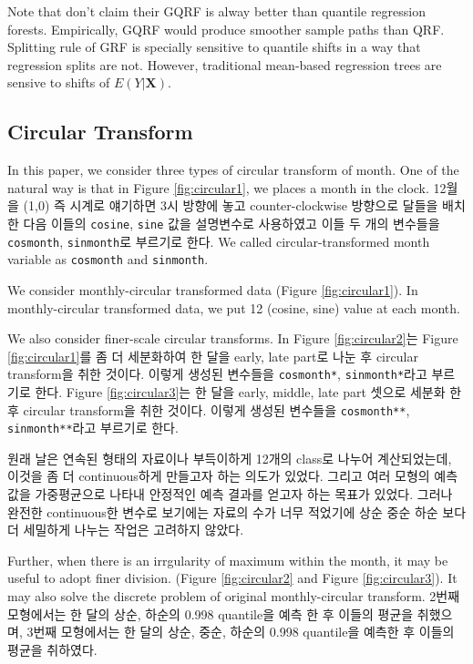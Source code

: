 \documentclass[11pt,titlepage]{article}
\begin{document}
	Note that \citep{Athey2016} don't claim their GQRF is alway better than quantile regression forests. Empirically, GQRF would produce smoother sample paths than QRF. Splitting rule of GRF is specially sensitive to quantile shifts in a way that regression splits are not. However, traditional mean-based regression trees are sensive to shifts of $E(Y|\mathbf{X})$.
	
	\subsection{Circular Transform}
	
	In this paper, we consider three types of circular transform of month. One of the natural way is that in Figure \ref{fig:circular1}, we places a month in the clock. 12월을 (1,0) 즉 시계로 얘기하면 3시 방향에 놓고 counter-clockwise 방향으로 달들을 배치한 다음 이들의 \texttt{cosine}, \texttt{sine} 값을 설명변수로 사용하였고 이들 두 개의 변수들을 \texttt{cosmonth}, \texttt{sinmonth}로 부르기로 한다. We called circular-transformed month variable as \texttt{cosmonth} and \texttt{sinmonth}.
	
	We consider monthly-circular transformed data (Figure \ref{fig:circular1}). In monthly-circular transformed data, we put 12 (cosine, sine) value at each month.
	
	We also consider finer-scale circular transforms. In Figure \ref{fig:circular2}는 Figure \ref{fig:circular1}를 좀 더 세분화하여 한 달을 early, late part로 나눈 후 circular transform을 취한 것이다. 이렇게 생성된 변수들을 \texttt{cosmonth*}, \texttt{sinmonth*}라고 부르기로 한다. Figure \ref{fig:circular3}는 한 달을 early, middle, late part 셋으로 세분화 한 후 circular transform을 취한 것이다. 이렇게 생성된 변수들을 \texttt{cosmonth**}, \texttt{sinmonth**}라고 부르기로 한다.
	
	원래 날은 연속된 형태의 자료이나 부득이하게 12개의 class로 나누어 계산되었는데, 이것을 좀 더 continuous하게 만들고자 하는 의도가 있었다. 그리고 여러 모형의 예측값을 가중평균으로 나타내 안정적인 예측 결과를 얻고자 하는 목표가 있었다. 그러나 완전한 continuous한 변수로 보기에는 자료의 수가 너무 적었기에 상순 중순 하순 보다 더 세밀하게 나누는 작업은 고려하지 않았다.
	
	
	Further, when there is an irrgularity of maximum within the month, it may be useful to adopt finer division. (Figure \ref{fig:circular2} and Figure \ref{fig:circular3}). It may also solve the discrete problem of original monthly-circular transform. 2번째 모형에서는 한 달의 상순, 하순의 0.998 quantile을 예측 한 후 이들의 평균을 취했으며, 3번째 모형에서는 한 달의 상순, 중순, 하순의 0.998 quantile을 예측한 후 이들의 평균을 취하였다.
	
\end{document}
